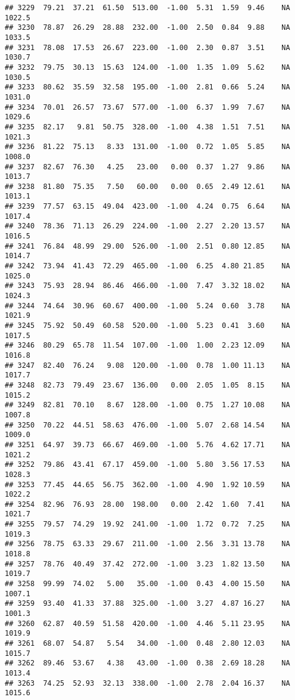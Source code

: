 \documentclass{article}\usepackage{graphicx, color}
\makeatletter
\newenvironment{kframe}{%
 \def\at@end@of@kframe{}%
 \ifinner\ifhmode%
  \def\at@end@of@kframe{\end{minipage}}%
  \begin{minipage}{\columnwidth}%
 \fi\fi%
 \def\FrameCommand##1{\hskip\@totalleftmargin \hskip-\fboxsep
 \colorbox{shadecolor}{##1}\hskip-\fboxsep
     \hskip-\linewidth \hskip-\@totalleftmargin \hskip\columnwidth}%
 \MakeFramed {\advance\hsize-\width
   \@totalleftmargin\z@ \linewidth\hsize
   \@setminipage}}%
 {\par\unskip\endMakeFramed%
 \at@end@of@kframe}
\newenvironment{knitrout}{}{} %
\makeatother
\begin{document}
\begin{knitrout}
\begin{kframe}
\begin{verbatim}
## 3229  79.21  37.21  61.50  513.00  -1.00  5.31  1.59  9.46    NA 1022.5
## 3230  78.87  26.29  28.88  232.00  -1.00  2.50  0.84  9.88    NA 1033.5
## 3231  78.08  17.53  26.67  223.00  -1.00  2.30  0.87  3.51    NA 1030.7
## 3232  79.75  30.13  15.63  124.00  -1.00  1.35  1.09  5.62    NA 1030.5
## 3233  80.62  35.59  32.58  195.00  -1.00  2.81  0.66  5.24    NA 1031.0
## 3234  70.01  26.57  73.67  577.00  -1.00  6.37  1.99  7.67    NA 1029.6
## 3235  82.17   9.81  50.75  328.00  -1.00  4.38  1.51  7.51    NA 1021.3
## 3236  81.22  75.13   8.33  131.00  -1.00  0.72  1.05  5.85    NA 1008.0
## 3237  82.67  76.30   4.25   23.00   0.00  0.37  1.27  9.86    NA 1013.7
## 3238  81.80  75.35   7.50   60.00   0.00  0.65  2.49 12.61    NA 1013.1
## 3239  77.57  63.15  49.04  423.00  -1.00  4.24  0.75  6.64    NA 1017.4
## 3240  78.36  71.13  26.29  224.00  -1.00  2.27  2.20 13.57    NA 1016.5
## 3241  76.84  48.99  29.00  526.00  -1.00  2.51  0.80 12.85    NA 1014.7
## 3242  73.94  41.43  72.29  465.00  -1.00  6.25  4.80 21.85    NA 1025.0
## 3243  75.93  28.94  86.46  466.00  -1.00  7.47  3.32 18.02    NA 1024.3
## 3244  74.64  30.96  60.67  400.00  -1.00  5.24  0.60  3.78    NA 1021.9
## 3245  75.92  50.49  60.58  520.00  -1.00  5.23  0.41  3.60    NA 1017.5
## 3246  80.29  65.78  11.54  107.00  -1.00  1.00  2.23 12.09    NA 1016.8
## 3247  82.40  76.24   9.08  120.00  -1.00  0.78  1.00 11.13    NA 1017.7
## 3248  82.73  79.49  23.67  136.00   0.00  2.05  1.05  8.15    NA 1015.2
## 3249  82.81  70.10   8.67  128.00  -1.00  0.75  1.27 10.08    NA 1007.8
## 3250  70.22  44.51  58.63  476.00  -1.00  5.07  2.68 14.54    NA 1009.0
## 3251  64.97  39.73  66.67  469.00  -1.00  5.76  4.62 17.71    NA 1021.2
## 3252  79.86  43.41  67.17  459.00  -1.00  5.80  3.56 17.53    NA 1028.3
## 3253  77.45  44.65  56.75  362.00  -1.00  4.90  1.92 10.59    NA 1022.2
## 3254  82.96  76.93  28.00  198.00   0.00  2.42  1.60  7.41    NA 1021.7
## 3255  79.57  74.29  19.92  241.00  -1.00  1.72  0.72  7.25    NA 1019.3
## 3256  78.75  63.33  29.67  211.00  -1.00  2.56  3.31 13.78    NA 1018.8
## 3257  78.76  40.49  37.42  272.00  -1.00  3.23  1.82 13.50    NA 1019.7
## 3258  99.99  74.02   5.00   35.00  -1.00  0.43  4.00 15.50    NA 1007.1
## 3259  93.40  41.33  37.88  325.00  -1.00  3.27  4.87 16.27    NA 1001.3
## 3260  62.87  40.59  51.58  420.00  -1.00  4.46  5.11 23.95    NA 1019.9
## 3261  68.07  54.87   5.54   34.00  -1.00  0.48  2.80 12.03    NA 1015.7
## 3262  89.46  53.67   4.38   43.00  -1.00  0.38  2.69 18.28    NA 1013.4
## 3263  74.25  52.93  32.13  338.00  -1.00  2.78  2.04 16.37    NA 1015.6

\end{verbatim}
\end{kframe}
\end{knitrout}
\end{document}
